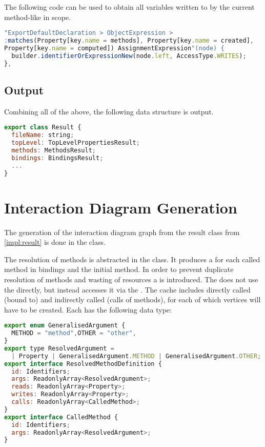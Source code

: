 The following code can be used to obtain all variables written to by the current method-like in scope. 
\begin{lstlisting}[language=JavaScript]
"ExportDefaultDeclaration > ObjectExpression > 
:matches(Property[key.name = methods], Property[key.name = created],
Property[key.name = computed]) AssignmentExpression"(node) {
  builder.identifierOrExpressionNew(node.left, AccessType.WRITES);
},
\end{lstlisting}
\subsection{Output}
Combining all of the above, the following data structure is output.
\begin{lstlisting}[language=JavaScript]
export class Result {
  fileName: string;
  topLevel: TopLevelPropertiesResult;
  methods: MethodsResult;
  bindings: BindingsResult;
  ...
}
\end{lstlisting}
\label{impl:result}
\section{Interaction Diagram Generation}
The generation of the interaction diagram graph from the result class from \ref{impl:result} is done in the  class. 

The resolution of methods is abstracted in the  class. It produces a 
 for each called method in bindings and the initial method. In order to prevent duplicate resolution of methods and wasting of resources a  is introduced. The  does not use the  directly, but instead accesses it via the . The cache includes directly called (bound to) and indirectly called (calls of methods), for each of which vertices will have to be created. 
Each  has the following data type:
\begin{lstlisting}[language=JavaScript]
export enum GeneralisedArgument {
  METHOD = "method",OTHER = "other",
}
export type ResolvedArgument =
  | Property | GeneralisedArgument.METHOD | GeneralisedArgument.OTHER;
export interface ResolvedMethodDefinition {
  id: Identifiers;
  args: ReadonlyArray<ResolvedArgument>;
  reads: ReadonlyArray<Property>;
  writes: ReadonlyArray<Property>;
  calls: ReadonlyArray<CalledMethod>;
}
export interface CalledMethod {
  id: Identifiers;
  args: ReadonlyArray<ResolvedArgument>;
}
\end{lstlisting}


